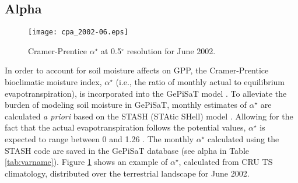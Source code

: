 \subsection{Alpha}
\label{sec:gepcp}
\begin{figure}[h!]
    \texttt{[image: cpa\_2002-06.eps]}
    \caption{Cramer-Prentice $\alpha^{\star}$ at 0.5$^{\circ}$ resolution for June 
    2002.}
    \label{fig:cpa}
\end{figure}
In order to account for soil moisture affects on GPP, the Cramer-Prentice bioclimatic moisture index, $\alpha^{\star}$ (i.e., the ratio of monthly actual to equilibrium evapotranspiration), is incorporated into the GePiSaT model \parencite{cramer88,gallego-sala10}. 
To alleviate the burden of modeling soil moisture in GePiSaT, monthly estimates of $\alpha^{\star}$ are calculated \textit{a priori} based on the STASH (STAtic SHell) model \parencite{sykesprent95,sykesprent96,sykes96}.
Allowing for the fact that the actual evapotranspiration follows the potential values, $\alpha^{\star}$ is expected to range between 0 and 1.26 \parencite{lhomme97,priestley72}.
The monthly $\alpha^{\star}$ calculated using the STASH code are saved in the GePiSaT database (see alpha in Table \ref{tab:varname}).
Figure \ref{fig:cpa} shows an example of $\alpha^{\star}$, calculated from CRU TS climatology, distributed over the terrestrial landscape for June 2002.
